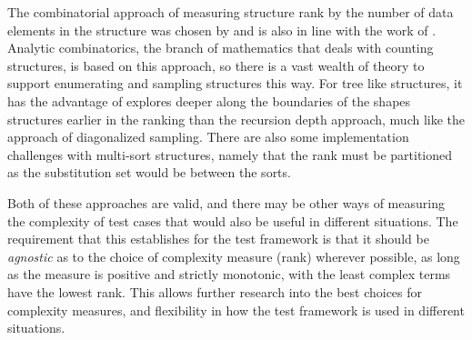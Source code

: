 The combinatorial approach of measuring structure rank by the number of data elements in the structure
was chosen by \FEAT and is also in line with the work of .
Analytic combinatorics, the branch of mathematics that deals with counting structures,
is based on this approach, so there is a vast wealth of theory to support enumerating and sampling
structures this way.
For tree like structures, it has the advantage of explores deeper along the boundaries
of the shapes structures earlier in the ranking than the recursion depth approach,
much like the \EC approach of diagonalized sampling.
There are also some implementation challenges with multi-sort structures,
namely that the rank must be partitioned as the substitution set would be between the sorts.

Both of these approaches are valid,
and there may be other ways of measuring the complexity of test cases
that would also be useful in different situations.
The requirement that this establishes for the test framework is that
it should be \emph{agnostic} as to the choice of complexity measure (rank) wherever possible,
as long as the measure is positive and strictly monotonic,
with the least complex terms have the lowest rank.
This allows further research into the best choices for complexity measures,
and flexibility in how the test framework is used in different situations.

